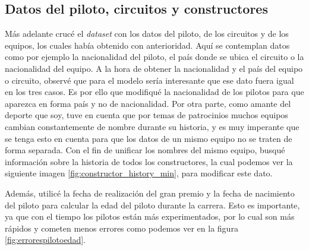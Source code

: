 \subsection{Datos del piloto, circuitos y constructores}
Más adelante crucé el \textit{dataset} con los datos del piloto, de los circuitos y de los equipos, los cuales había obtenido con anterioridad. Aquí se contemplan datos como por ejemplo la nacionalidad del piloto, el país donde se ubica el circuito o la nacionalidad del equipo. 
A la hora de obtener la nacionalidad y el país del equipo o circuito, observé que para el modelo sería interesante que ese dato fuera igual en los tres casos. Es por ello que modifiqué la nacionalidad de los pilotos para que aparezca en forma país y no de nacionalidad. 
Por otra parte, como amante del deporte que soy, tuve en cuenta que por temas de patrocinios muchos equipos cambian constantemente de nombre durante su historia, y es muy imperante que se tenga esto en cuenta para que los datos de un mismo equipo no se traten de forma separada. Con el fin de unificar los nombres del mismo equipo, busqué información sobre la historia de todos los constructores, la cual podemos ver la siguiente imagen \ref{fig:constructor_history_min}, para modificar este dato.


Además, utilicé la fecha de realización del gran premio y la fecha de nacimiento del piloto para calcular la edad del piloto durante la carrera. Esto es importante, ya que con el tiempo los pilotos están más experimentados, por lo cual son más rápidos y cometen menos errores como podemos ver en la figura \ref{fig:errorespilotoedad}.


